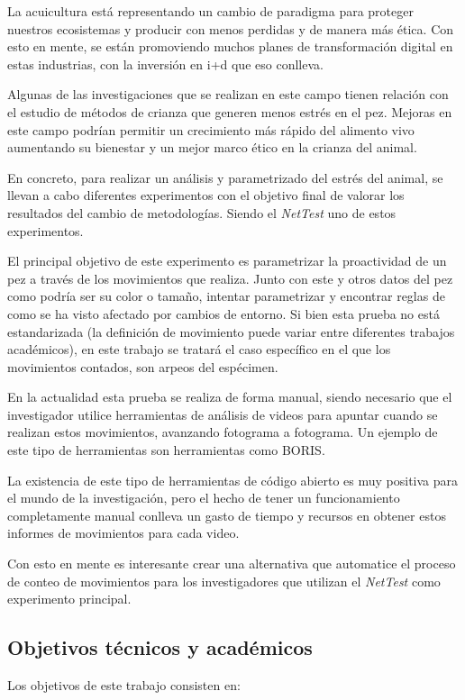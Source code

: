 La acuicultura está representando un cambio de paradigma para proteger nuestros ecosistemas y producir con menos perdidas y de manera más ética. Con esto en mente, se están 
promoviendo muchos planes de transformación digital en estas industrias, con la inversión en \acrshort{i+d} que eso conlleva.

Algunas de las investigaciones que se realizan en este campo tienen relación con el estudio de métodos de crianza que generen menos estrés en el pez. Mejoras en este campo podrían 
permitir un crecimiento más rápido del alimento vivo aumentando su bienestar y un mejor marco ético en la crianza del animal.

En concreto, para realizar un análisis y parametrizado del estrés del animal, se llevan a cabo diferentes experimentos con el objetivo final de valorar los resultados del cambio de metodologías. 
Siendo el \textit{NetTest}\cite{barriossanchezPruebaRedEvaluando2023} uno de estos experimentos.

El principal objetivo de este experimento es parametrizar la proactividad de un pez a través de los movimientos que realiza. Junto con este y otros datos del pez como podría ser su color o tamaño, 
intentar parametrizar y encontrar reglas de como se ha visto afectado por cambios de entorno. Si bien esta prueba no está estandarizada (la definición de movimiento puede variar entre diferentes 
trabajos académicos), en este trabajo se tratará el caso específico en el que los movimientos contados, son arpeos del espécimen.

En la actualidad esta prueba se realiza de forma manual, siendo necesario que el investigador utilice herramientas de análisis de videos para apuntar cuando se realizan estos movimientos, 
avanzando fotograma a fotograma. Un ejemplo de este tipo de herramientas son herramientas como BORIS\cite{friardBORISFreeVersatile2016}.

La existencia de este tipo de herramientas de código abierto es muy positiva para el mundo de la investigación, pero el hecho de tener un funcionamiento completamente manual conlleva un gasto 
de tiempo y recursos en obtener estos informes de movimientos para cada video.

Con esto en mente es interesante crear una alternativa que automatice el proceso de conteo de movimientos para los investigadores que utilizan el \textit{NetTest} como experimento principal.

\subsection{Objetivos técnicos y académicos}
Los objetivos de este trabajo consisten en:

